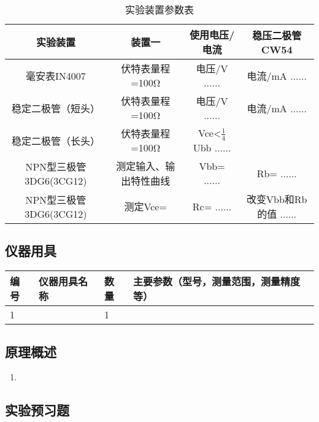 \documentclass[dvipsnames, svgnames,a4paper,11pt]{article}
\begin{document}
	\begin{table}[h!]
		\centering
		\begin{tabular}{|c|c|c|c|}
		\hline
		\textbf{实验装置} & \textbf{装置一} & \textbf{使用电压/电流} & \textbf{稳压二极管CW54} \\
		\hline
		毫安表IN4007 & 伏特表量程=100Ω & 电压/V ...... & 电流/mA ...... \\
		\hline
		稳定二极管（短头） & 伏特表量程=100Ω & 电压/V ...... & 电流/mA ...... \\
		\hline
		稳定二极管（长头） & 伏特表量程=100Ω & Vce<\( \frac{1}{4} \)Ubb ...... &  \\
		\hline
		NPN型三极管3DG6(3CG12) & 测定输入、输出特性曲线 & Vbb= ...... & Rb= ...... \\
		\hline
		NPN型三极管3DG6(3CG12) & 测定Vce= & Rc= ...... & 改变Vbb和Rb的值 ...... \\
		\hline
		\end{tabular}
		\caption{实验装置参数表}
		\label{table:experiment_device_parameters}
		\end{table}
		
	\subsection{仪器用具}
	\begin{table}[htbp]
		\centering
		\renewcommand\arraystretch{1.6}
		\begin{tabular}{p{}|p{}|p{}|p{}}
			\hline
			编号& 仪器用具名称 & 数量 &  主要参数（型号，测量范围，测量精度等） \\
			\hline
			1&  & 1 &  \\
			\hline
		\end{tabular}
	\end{table}
	
	\subsection{原理概述}
	\begin{enumerate}
		\item 
	\end{enumerate}
	
	
	
	\subsection{实验预习题}
	
\end{document}
